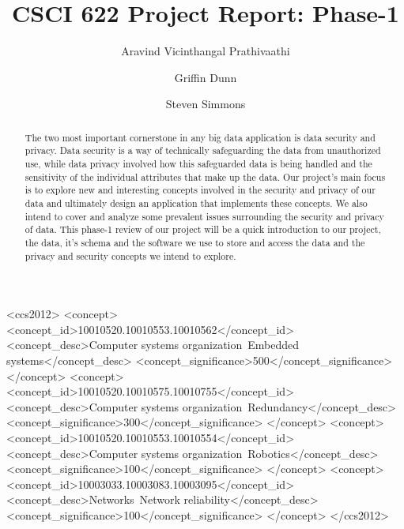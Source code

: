 \documentclass[sigconf]{acmart}
\begin{document}
%
\title{CSCI 622 Project Report: Phase-1}

%
\author{Aravind Vicinthangal Prathivaathi}
\author {Griffin Dunn}
\author{Steven Simmons}
%
\begin{abstract}
The two most important cornerstone in any big data application is data security and privacy. Data security is a way of technically safeguarding the data from unauthorized use, while data privacy involved how this safeguarded data is being handled and the sensitivity of the individual attributes that make up the data. Our project's main focus is to explore new and interesting concepts involved in the security and privacy of our data and ultimately design an application that implements these concepts. We also intend to cover and analyze some prevalent issues surrounding the security and privacy of data. This phase-1 review of our project will be a quick introduction to our project, the data, it's schema and the software we use to store and access the data and the privacy and security concepts we intend to explore. 
\end{abstract}

%
%
\begin{CCSXML}
<ccs2012>
 <concept>
  <concept_id>10010520.10010553.10010562</concept_id>
  <concept_desc>Computer systems organization~Embedded systems</concept_desc>
  <concept_significance>500</concept_significance>
 </concept>
 <concept>
  <concept_id>10010520.10010575.10010755</concept_id>
  <concept_desc>Computer systems organization~Redundancy</concept_desc>
  <concept_significance>300</concept_significance>
 </concept>
 <concept>
  <concept_id>10010520.10010553.10010554</concept_id>
  <concept_desc>Computer systems organization~Robotics</concept_desc>
  <concept_significance>100</concept_significance>
 </concept>
 <concept>
  <concept_id>10003033.10003083.10003095</concept_id>
  <concept_desc>Networks~Network reliability</concept_desc>
  <concept_significance>100</concept_significance>
 </concept>
</ccs2012>
\end{CCSXML}
\end{document}
